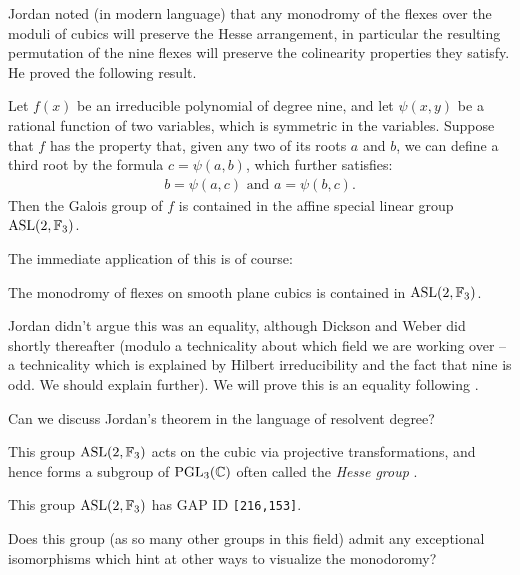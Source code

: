 \documentclass[11pt]{amsart}
\providecommand{\ASL}{\mathrm{ASL}}
\begin{document}
Jordan noted (in modern language) that any monodromy of the flexes over the moduli of cubics will preserve the Hesse arrangement, in particular the resulting permutation of the nine flexes will preserve the colinearity properties they satisfy. He proved the following result.

\begin{theorem} Let $f(x)$ be an irreducible polynomial of degree nine, and let $\psi(x,y)$ be a rational function of two variables, which is symmetric in the variables. Suppose that $f$ has the property that, given any two of its roots $a$ and $b$, we can define a third root by the formula $c = \psi(a,b)$, which further satisfies:
\begin{align*}
    b = \psi(a,c) \text{ and } a = \psi(b,c).
\end{align*}
Then the Galois group of $f$ is contained in the affine special linear group $\ASL(2,\F_3)$.
\end{theorem}

The immediate application of this is of course:

\begin{corollary} The monodromy of flexes on smooth plane cubics is contained in $\ASL(2,\F_3)$.
\end{corollary}

Jordan didn't argue this was an equality, although Dickson and Weber did shortly thereafter (modulo a technicality about which field we are working over -- a technicality which is explained by Hilbert irreducibility and the fact that nine is odd. We should explain further). We will prove this is an equality following \cite[\S~II.2]{Harris-Galois}.

\begin{question} Can we discuss Jordan's theorem in the language of resolvent degree?
\end{question}


\begin{note} This group $\ASL(2,\F_3)$ acts on the cubic via projective transformations, and hence forms a subgroup of $\mathrm{PGL}_3(\mathbb{C})$ often called the \textit{Hesse group} \cite[\S3.1.4]{Dolgachev}.
\end{note}

\begin{note} This group $\ASL(2,\F_3)$ has GAP ID \texttt{[216,153]}.
\end{note}

\begin{question} Does this group (as so many other groups in this field) admit any exceptional isomorphisms which hint at other ways to visualize the monodoromy?
\end{question}
\end{document}
